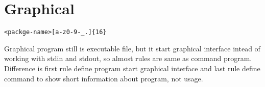 \section{Graphical}

\begin{crules}
    \verb/<packge-name>[a-z0-9-_.]{16}/
\end{crules}

Graphical program still is executable file, but it start graphical interface
intead of working with stdin and stdout, so almost rules are same as
command program. Difference is first rule define program start graphical
interface and last rule define  command to show short information
about program, not usage.
